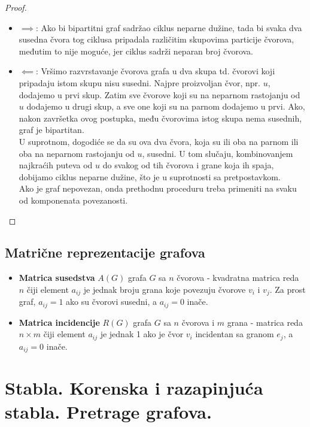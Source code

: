 \documentclass[a4paper,12pt]{article}
\numberwithin{algorithm}{section}
\theoremstyle{plain}
\theoremstyle{definition}
\theoremstyle{remark}
\begin{document}
\begin{proof}\
    \begin{itemize}
        \item $\implies$: 
        Ako bi bipartitni graf sadržao ciklus neparne dužine, tada bi svaka dva susedna čvora tog ciklusa pripadala različitim skupovima particije čvorova, međutim to nije moguće, jer ciklus sadrži neparan broj čvorova.
        \item $\impliedby$:
        Vršimo razvrstavanje čvorova grafa u dva skupa td. čvorovi koji pripadaju istom skupu nisu susedni. Najpre proizvoljan čvor, npr. $u$, dodajemo u prvi skup. Zatim sve čvorove koji su na neparnom rastojanju od $u$ dodajemo u drugi skup, a sve one koji su na parnom dodajemo u prvi. Ako, nakon završetka ovog postupka, među čvorovima istog skupa nema susednih, graf je bipartitan. \\ U suprotnom, dogodiće se da su ova dva čvora, koja su ili oba na parnom ili oba na neparnom rastojanju od $u$, susedni. U tom slučaju, kombinovanjem najkraćih puteva od $u$ do svakog od tih čvorova i grane koja ih spaja, dobijamo ciklus neparne dužine, što je u suprotnosti sa pretpostavkom. \\ Ako je graf nepovezan, onda prethodnu proceduru treba primeniti na svaku od komponenata povezanosti.
    \end{itemize}
\end{proof}
\subsection{Matrične reprezentacije grafova}
\begin{itemize}
    \item \textbf{Matrica susedstva} $A(G)$ grafa $G$ sa $n$ čvorova - kvadratna matrica reda $n$ čiji element $a_{ij}$ je jednak broju grana koje povezuju čvorove $v_i$ i $v_j$. Za prost graf, $a_{ij} = 1$ ako su čvorovi susedni, a $a_{ij} = 0$ inače.
    \item \textbf{Matrica incidencije} $R(G)$ grafa $G$ sa $n$ čvorova i $m$ grana - matrica reda $n \times m$ čiji element $a_{ij}$ je jednak 1 ako je čvor $v_i$ incidentan sa granom $e_j$, a $a_{ij} = 0$ inače.
\end{itemize}
\newpage
\section{Stabla. Korenska i razapinjuća stabla. Pretrage grafova. }
\end{document}

